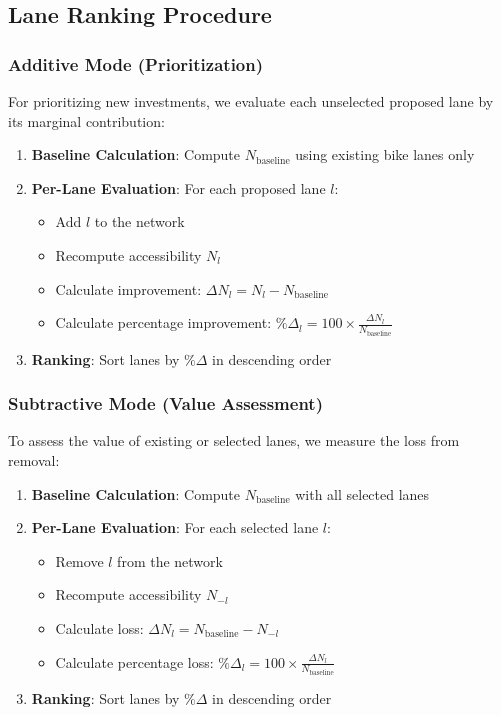\documentclass[12pt,a4paper]{article}
\begin{document}
\subsection{Lane Ranking Procedure}

\subsubsection{Additive Mode (Prioritization)}

For prioritizing new investments, we evaluate each unselected proposed lane by its marginal contribution:

\begin{enumerate}
    \item \textbf{Baseline Calculation}: Compute $N_{\text{baseline}}$ using existing bike lanes only
    \item \textbf{Per-Lane Evaluation}: For each proposed lane $l$:
    \begin{itemize}
        \item Add $l$ to the network
        \item Recompute accessibility $N_l$
        \item Calculate improvement: $\Delta N_l = N_l - N_{\text{baseline}}$
        \item Calculate percentage improvement: $\%\Delta_l = 100 \times \frac{\Delta N_l}{N_{\text{baseline}}}$
    \end{itemize}
    \item \textbf{Ranking}: Sort lanes by $\%\Delta$ in descending order
\end{enumerate}

\subsubsection{Subtractive Mode (Value Assessment)}

To assess the value of existing or selected lanes, we measure the loss from removal:

\begin{enumerate}
    \item \textbf{Baseline Calculation}: Compute $N_{\text{baseline}}$ with all selected lanes
    \item \textbf{Per-Lane Evaluation}: For each selected lane $l$:
    \begin{itemize}
        \item Remove $l$ from the network
        \item Recompute accessibility $N_{-l}$
        \item Calculate loss: $\Delta N_l = N_{\text{baseline}} - N_{-l}$
        \item Calculate percentage loss: $\%\Delta_l = 100 \times \frac{\Delta N_l}{N_{\text{baseline}}}$
    \end{itemize}
    \item \textbf{Ranking}: Sort lanes by $\%\Delta$ in descending order
\end{enumerate}
\end{document}
